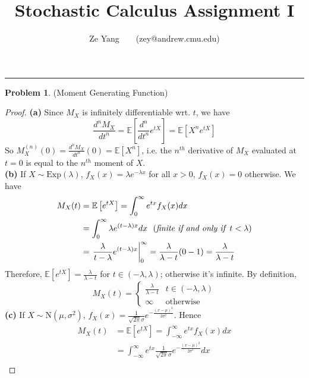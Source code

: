 \documentclass[a4paper, 10pt]{article}
\title{\textbf{Stochastic Calculus Assignment I}}
\author{Ze Yang~~~~(zey@andrew.cmu.edu)}
\theoremstyle{definition}
\newtheorem{problem}{Problem}
\theoremstyle{hSol}
\begin{document}
\maketitle



\noindent\rule{16cm}{0.4pt}
\begin{problem} (Moment Generating Function)
\end{problem}
\begin{proof} \textbf{(a)} Since $M_X$ is infinitely differentiable wrt. $t$, we have
$$
\frac{d^n M_X}{d t^n} = \mathbb{E}\left[\frac{d^n}{d t^n} e^{tX}\right] = \mathbb{E}\left[X^n e^{tX}\right]
$$
So $M^{(n)}_X(0)=\frac{d^n M_X}{d t^n}(0) = \mathbb{E}\left[X^n\right]$, i.e. the $n^{th}$ derivative of $M_X$ evaluated at $t=0$ is equal to the $n^{th}$ moment of $X$. \\
\textbf{(b)} If $X\sim \text{Exp}(\lambda)$, $f_X(x) = \lambda e^{-\lambda x}$ for all $x > 0$, $f_X(x)=0$ otherwise. We have
\begin{equation}
	\begin{split}
		M_X(t) &= \mathbb{E}\left[e^{tX}\right] = \int_{0}^{\infty} e^{tx} f_X(x)dx \\
		& = \int_{0}^{\infty} \lambda e^{(t-\lambda) x}dx ~~\text{(\textit{finite if and only if }}t<\lambda)\\
		&= \left.\frac{\lambda }{t- \lambda} e^{(t- \lambda)x} \right\rvert_0^{\infty} = \frac{\lambda}{\lambda-t}(0-1) = \frac{\lambda}{\lambda-t}
	\end{split}
\end{equation}
Therefore, $\mathbb{E}\left[e^{tX}\right] = \frac{\lambda}{\lambda-t}$ for $t\in (-\lambda, \lambda)$; otherwise it's infinite. By definition, 
$$
M_X(t) = \begin{cases}
\frac{\lambda}{\lambda-t} & t \in  (-\lambda, \lambda) \\
\infty & \text{otherwise}
\end{cases}
$$
\textbf{(c)} If $X\sim \text{N}(\mu, \sigma^2)$, $f_X(x) = \frac{1}{\sqrt{2\pi}\sigma} e^{-\frac{(x-\mu)^2}{2\sigma^2}}$. Hence
\begin{equation}
	\begin{split}
		M_X(t) &= \mathbb{E}\left[e^{tX}\right] = \int_{-\infty}^{\infty} e^{tx} f_X(x)dx \\
		& = \int_{-\infty}^{\infty} e^{tx} \frac{1}{\sqrt{2\pi}\sigma} e^{-\frac{(x-\mu)^2}{2\sigma^2}}dx \\

\end{split}
\end{equation}
\end{proof}
\end{document}
